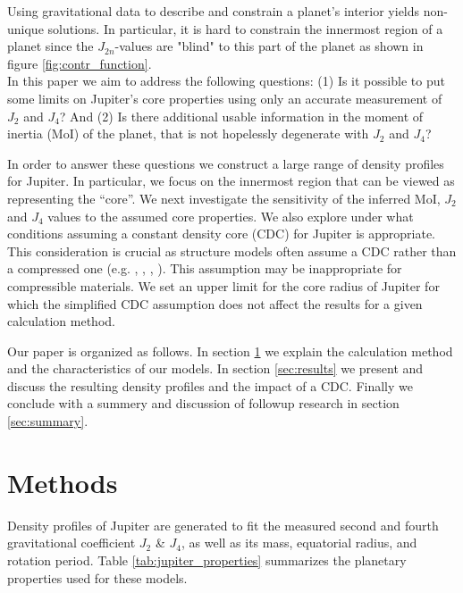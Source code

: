 \documentclass[usenatbib]{mnras}
\begin{document}
Using gravitational data to describe and constrain a planet's interior yields non-unique solutions. In particular, it is hard to constrain the innermost region of a planet since the $J_{2n}$-values are "blind" to this part of the planet as shown in figure \ref{fig:contr_function}. \\

In this paper we aim to address the following questions: (1) Is it possible to put some limits on Jupiter's core properties using only an accurate measurement of $J_2$ and $J_4$? And (2) Is there additional usable information in the moment of inertia (MoI) of the planet, that is not hopelessly degenerate with $J_2$ and $J_4$? %

In order to answer these questions we construct a large range of density profiles for Jupiter. In particular, we focus on the innermost region that can be viewed as representing the ``core''.  We next investigate the sensitivity of the inferred MoI, $J_2$ and $J_4$ values to the assumed core properties.
We also explore under what conditions assuming a constant density core (CDC) for Jupiter is appropriate. This consideration is crucial as structure models often assume a CDC rather than a compressed one (e.g. \cite{HELLED2011440}, \cite{Hubbard_2016}, \cite{Ni2018}, \cite{Debras_2019}). This assumption may be inappropriate for compressible materials. 
We set an upper limit for the core radius of Jupiter for which the simplified CDC assumption does not affect the results for a given calculation method.

Our paper is organized as follows. In section \ref{sec:methods} we explain the calculation method and the characteristics of our models. In section \ref{sec:results} we present and discuss the resulting density profiles and the impact of a CDC. Finally we conclude with a summery and discussion of followup research in section \ref{sec:summary}.

\section{Methods} \label{sec:methods}
Density profiles of Jupiter are generated to fit the measured second and fourth gravitational coefficient $J_2$ \& $J_4$, as well as its mass, equatorial radius, and rotation period. Table \ref{tab:jupiter_properties} summarizes the planetary properties used for these models. 
\end{document}
